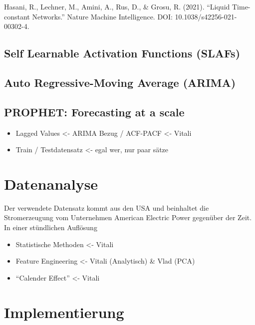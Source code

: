 \documentclass[11pt,ngerman,a4paper,]{article}
\providecommand{\tightlist}{%
  \setlength{\itemsep}{0pt}\setlength{\parskip}{0pt}}
\begin{document}
Hasani, R., Lechner, M., Amini, A., Rus, D., \& Grosu, R. (2021). ``Liquid Time-constant Networks.'' Nature Machine Intelligence. DOI: 10.1038/s42256-021-00302-4.

\subsection{Self Learnable Activation Functions (SLAFs)}\label{self-learnable-activation-functions-slafs}

\subsection{Auto Regressive-Moving Average (ARIMA)}\label{auto-regressive-moving-average-arima}

\subsection{PROPHET: Forecasting at a scale}\label{prophet-forecasting-at-a-scale}

\begin{itemize}
\tightlist
\item
  Lagged Values \textless- ARIMA Bezug / ACF-PACF \textless- Vitali
\item
  Train / Testdatensatz \textless- egal wer, nur paar sätze
\end{itemize}

\section{Datenanalyse}\label{datenanalyse}

Der verwendete Datensatz kommt aus den USA und beinhaltet die Stromerzeugung
vom Unternehmen American Electric Power gegenüber der Zeit. In einer stündlichen Auflösung

\begin{itemize}
\tightlist
\item
  Statistische Methoden \textless- Vitali
\item
  Feature Engineering \textless- Vitali (Analytisch) \& Vlad (PCA)
\item
  ``Calender Effect'' \textless- Vitali
\end{itemize}

\section{Implementierung}\label{implementierung}
\end{document}

